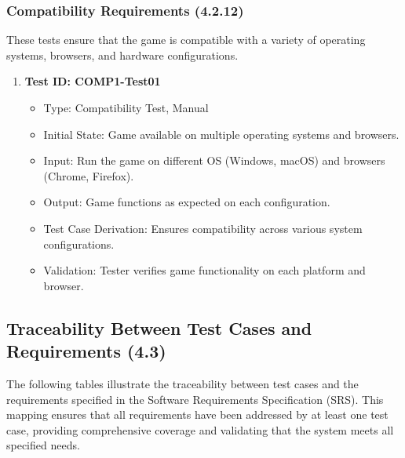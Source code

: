 \documentclass[12pt, titlepage]{article}
\begin{document}
\subsubsection{Compatibility Requirements (4.2.12)}

These tests ensure that the game is compatible with a variety of operating systems, browsers, and hardware configurations.

\begin{enumerate}
    \item \textbf{Test ID: COMP1-Test01}
        \begin{itemize}
            \item Type: Compatibility Test, Manual
            \item Initial State: Game available on multiple operating systems and browsers.
            \item Input: Run the game on different OS (Windows, macOS) and browsers (Chrome, Firefox).
            \item Output: Game functions as expected on each configuration.
            \item Test Case Derivation: Ensures compatibility across various system configurations.
            \item Validation: Tester verifies game functionality on each platform and browser.
        \end{itemize}
\end{enumerate}

\subsection{Traceability Between Test Cases and Requirements (4.3)}

The following tables illustrate the traceability between test cases and the requirements specified in the Software Requirements Specification (SRS). This mapping ensures that all requirements have been addressed by at least one test case, providing comprehensive coverage and validating that the system meets all specified needs.
\end{document}
